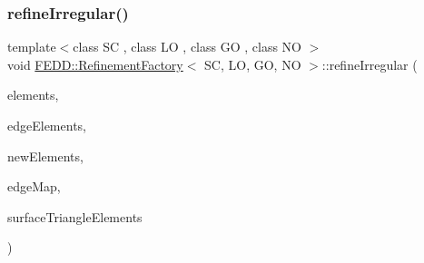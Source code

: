 \mbox{\label{classFEDD_1_1RefinementFactory_ae4401ece866b918923322d46d0c5e33e}} 
\subsubsection{\texorpdfstring{refine\+Irregular()}{refineIrregular()}}
{\footnotesize\ttfamily template$<$class SC , class LO , class GO , class NO $>$ \\
void \hyperlink{classFEDD_1_1RefinementFactory}{F\+E\+D\+D\+::\+Refinement\+Factory}$<$ SC, LO, GO, NO $>$\+::refine\+Irregular (\begin{DoxyParamCaption}\item[{\hyperlink{classFEDD_1_1RefinementFactory_a0994b5b7b6d080048673941251999f2e}{Elements\+Ptr\+\_\+\+Type}}]{elements,  }\item[{\hyperlink{classFEDD_1_1RefinementFactory_ae5285e990ec4632d6188a1280627ad13}{Edge\+Elements\+Ptr\+\_\+\+Type}}]{edge\+Elements,  }\item[{int \&}]{new\+Elements,  }\item[{\hyperlink{classFEDD_1_1RefinementFactory_a8256ccdf1b2a5c977ddc011f4e8eb8d3}{Map\+Const\+Ptr\+\_\+\+Type}}]{edge\+Map,  }\item[{\hyperlink{classFEDD_1_1RefinementFactory_a1067ba23325b19eae16a864f25f7d68f}{Surface\+Elements\+Ptr\+\_\+\+Type}}]{surface\+Triangle\+Elements }\end{DoxyParamCaption})}

\mbox{\label{classFEDD_1_1RefinementFactory_a7099db47add1a0f9e431fc960860db2d}} 
